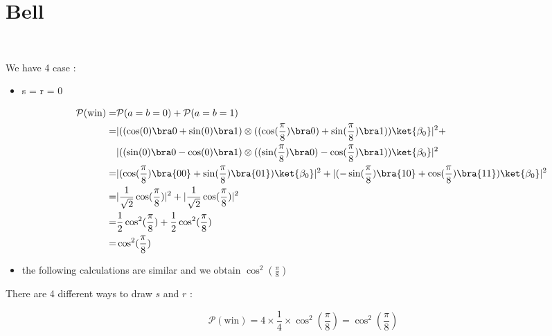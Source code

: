 \section{Bell}

~

We have 4 case :

\begin{itemize}
  \item s = r = 0

    \begin{align*}
      \mathcal P(\text{win}) =& \mathcal P(a = b = 0) + \mathcal P(a = b = 1) \\
      =& |((\cos(0) \bra 0 + \sin(0) \bra 1) \otimes
          ((\cos(\frac \pi 8) \bra 0) + \sin(\frac \pi 8) \bra 1)) \ket{\beta_0}|^2
          + \\
      & |((\sin(0) \bra 0 - \cos(0) \bra 1) \otimes
          ((\sin(\frac \pi 8) \bra 0) - \cos(\frac \pi 8) \bra 1))\ket{\beta_0}|^2
          \\
      =& |(\cos(\frac \pi 8)\bra{00} + \sin(\frac \pi 8)\bra{01})
      \ket{\beta_0}|^2 +
         |(-\sin(\frac \pi 8)\bra{10} + \cos(\frac \pi 8)\bra{11}) \ket{\beta_0}|^2
      \\
      =& |\frac{1}{\sqrt 2} \cos(\frac \pi 8)|^2 +
         |\frac{1}{\sqrt 2} \cos(\frac \pi 8)|^2 \\
      =& \frac 1 2 \cos^2(\frac \pi 8) + \frac 1 2 \cos^2(\frac \pi 8) \\
      =& \cos^2(\frac \pi 8)
    \end{align*}

  \item the following calculations are similar and we obtain
    $\cos^2(\frac \pi 8)$
\end{itemize}

There are 4 different ways to draw $s$ and $r$ :

$$ \mathcal P(\text{win}) = 4 \times \frac 1 4 \times \cos^2(\frac \pi 8)
= \cos^2(\frac \pi 8)$$

